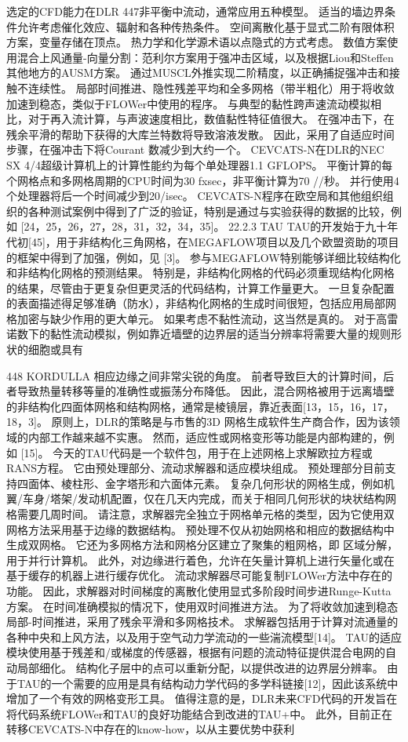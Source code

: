 \documentclass[UTF8,11pt,a4paper,openany,fontset=fandol]{ctexbook}
\begin{document}
选定的CFD能力在DLR 447非平衡中流动，通常应用五种模型。 适当的墙边界条件允许考虑催化效应、辐射和各种传热条件。 空间离散化基于显式二阶有限体积方案，变量存储在顶点。 热力学和化学源术语以点隐式的方式考虑。 数值方案使用混合上风通量-向量分割：范利尔方案用于强冲击区域，以及根据Liou和Steffen其他地方的AUSM方案。 通过MUSCL外推实现二阶精度，以正确捕捉强冲击和接触不连续性。 局部时间推进、隐性残差平均和全多网格（带半粗化）用于将收敛加速到稳态，类似于FLOWer中使用的程序。 与典型的黏性跨声速流动模拟相比，对于再入流计算，与声波速度相比，数值黏性特征值很大。 在强冲击下，在残余平滑的帮助下获得的大库兰特数将导致溶液发散。 因此，采用了自适应时间步骤，在强冲击下将Courant 数减少到大约一个。 CEVCATS-N在DLR的NEC SX 4/4超级计算机上的计算性能约为每个单处理器1.1 GFLOPS。 平衡计算的每个网格点和多网格周期的CPU时间为30 fxsec，非平衡计算为70 //秒。 并行使用4个处理器将后一个时间减少到20/isec。 CEVCATS-N程序在欧空局和其他组织组织的各种测试案例中得到了广泛的验证，特别是通过与实验获得的数据的比较，例如 [24，25，26，27，28，31，32，34，35]。 22.2.3 TAU TAU的开发始于九十年代初[45]，用于非结构化三角网格，在MEGAFLOW项目以及几个欧盟资助的项目的框架中得到了加强，例如，见 [3]。 参与MEGAFLOW特别能够详细比较结构化和非结构化网格的预测结果。 特别是，非结构化网格的代码必须重现结构化网格的结果，尽管由于更复杂但更灵活的代码结构，计算工作量更大。 一旦复杂配置的表面描述得足够准确（防水），非结构化网格的生成时间很短，包括应用局部网格加密与缺少作用的更大单元。 如果考虑不黏性流动，这当然是真的。 对于高雷诺数下的黏性流动模拟，例如靠近墙壁的边界层的适当分辨率将需要大量的规则形状的细胞或具有

448 KORDULLA 相应边缘之间非常尖锐的角度。 前者导致巨大的计算时间，后者导致热量转移等量的准确性或振荡分布降低。 因此，混合网格被用于远离墙壁的非结构化四面体网格和结构网格，通常是棱镜层，靠近表面[13，15，16，17，18，3]。 原则上，DLR的策略是与市售的3D 网格生成软件生产商合作，因为该领域的内部工作越来越不实惠。 然而，适应性或网格变形等功能是内部构建的，例如 [15]。 今天的TAU代码是一个软件包，用于在上述网格上求解欧拉方程或RANS方程。 它由预处理部分、流动求解器和适应模块组成。 预处理部分目前支持四面体、棱柱形、金字塔形和六面体元素。 复杂几何形状的网格生成，例如机翼/车身/塔架/发动机配置，仅在几天内完成，而关于相同几何形状的块状结构网格需要几周时间。 请注意，求解器完全独立于网格单元格的类型，因为它使用双网格方法采用基于边缘的数据结构。 预处理不仅从初始网格和相应的数据结构中生成双网格。 它还为多网格方法和网格分区建立了聚集的粗网格，即 区域分解，用于并行计算机。 此外，对边缘进行着色，允许在矢量计算机上进行矢量化或在基于缓存的机器上进行缓存优化。 流动求解器尽可能复制FLOWer方法中存在的功能。 因此，求解器对时间梯度的离散化使用显式多阶段时间步进Runge-Kutta方案。 在时间准确模拟的情况下，使用双时间推进方法。 为了将收敛加速到稳态局部-时间推进，采用了残余平滑和多网格技术。 求解器包括用于计算对流通量的各种中央和上风方法，以及用于空气动力学流动的一些湍流模型[14]。 TAU的适应模块使用基于残差和/或梯度的传感器，根据有问题的流动特征提供混合电网的自动局部细化。 结构化子层中的点可以重新分配，以提供改进的边界层分辨率。 由于TAU的一个需要的应用是具有结构动力学代码的多学科链接[12]，因此该系统中增加了一个有效的网格变形工具。 值得注意的是，DLR未来CFD代码的开发旨在将代码系统FLOWer和TAU的良好功能结合到改进的TAU+中。 此外，目前正在转移CEVCATS-N中存在的know-how，以从主要优势中获利
\end{document}
